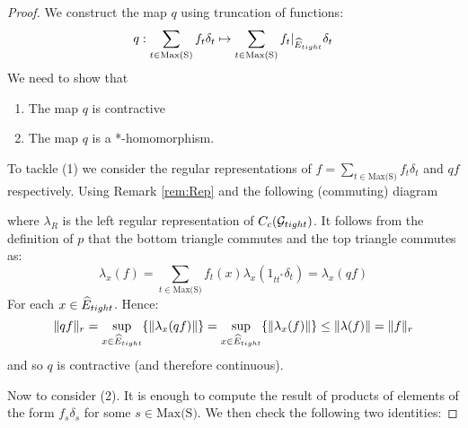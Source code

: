 \begin{corollary}
\begin{proof}
We construct the map $q$ using truncation of functions:
\begin{equation*}
q: \sum_{t \in \text{Max(S)}} f_{t} \delta_{t} \mapsto \sum_{t \in \text{Max(S)}} f_{t}|_{\widehat{E}_{tight}} \delta_{t} 
\end{equation*}
We need to show that
\begin{enumerate}
\item The map $q$ is contractive
\item The map $q$ is a *-homomorphism.
\end{enumerate}
To tackle (1) we consider the regular representations of $f = \sum_{t \in \text{Max(S)}} f_{t} \delta_{t}$ and $qf$ respectively. Using Remark \ref{rem:Rep} and the following (commuting) diagram

\begin{center}
\end{center}

where $\lambda_{R}$ is the left regular representation of $C_{c}(\mathcal{G}_{tight})$. It follows from the definition of $p$ that the bottom triangle commutes and the top triangle commutes as:
\begin{equation*}
\lambda_{x}(f) =\sum_{t \in \text{Max(S)}} f_{t}(x)\lambda_{x}(1_{tt^{*}}\delta_{t}) = \lambda_{x}(qf)
\end{equation*}
For each $x \in \widehat{E}_{tight}$. Hence:
\begin{equation*}
\Vert qf \Vert_{r} = \sup_{x \in \widehat{E}_{tight}} \lbrace \Vert \lambda_{x}(qf) \Vert \rbrace = \sup_{x \in \widehat{E}_{tight}} \lbrace \Vert \lambda_{x}(f) \Vert \rbrace \leq \Vert \lambda(f) \Vert = \Vert f \Vert_{r}
\end{equation*}
and so $q$ is contractive (and therefore continuous).
 
Now to consider (2). It is enough to compute the result of products of elements of the form $f_{s}\delta_{s}$ for some $s \in \text{Max(S)}$. We then check the following two identities:



\end{proof}
\end{corollary}
